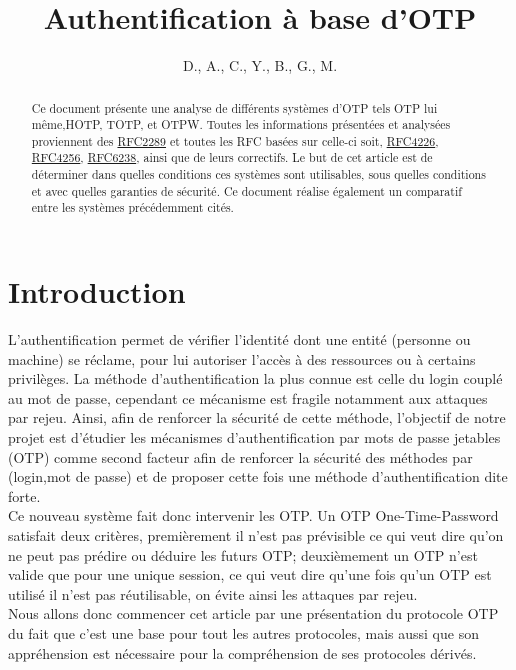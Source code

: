 \documentclass{../res/univ-projet}
\title{Authentification à base d'OTP}
\author{D.\bsc{Picard}, A.\bsc{Smondack}, C.\bsc{Hardouin}, Y.\bsc{Adegoloye}, B.\bsc{Zigh}, G.\bsc{Ferry}, M.\bsc{Michotte} }
\begin{document}
\maketitle

\begin{abstract}
Ce document présente une analyse de différents systèmes d'OTP tels \og{}OTP\fg{} lui même,\og{}HOTP\fg{}, \og{}TOTP\fg{},
et \og{}OTPW\fg{}. Toutes les informations présentées et analysées proviennent des \href{http://tools.ietf.org/html/rfc2289}{RFC2289} et 
toutes les RFC basées sur celle-ci soit, \href{http://tools.ietf.org/html/rfc4226}{RFC4226}, \href{http://tools.ietf.org/html/rfc4256}{RFC4256}, 
\href{http://tools.ietf.org/html/rfc6238}{RFC6238}, ainsi que de leurs correctifs. Le but de cet article est de déterminer dans quelles conditions 
ces systèmes sont utilisables, sous quelles conditions et avec quelles garanties de sécurité. Ce document réalise également un comparatif entre les 
systèmes précédemment cités.
\end{abstract}

\newpage
\tableofcontents
\newpage
\part{Introduction}
L'authentification permet de vérifier l'identité dont une entité (personne ou machine) se réclame, pour lui autoriser l'accès à des
ressources ou à certains privilèges. La méthode d'authentification la plus connue est celle du login couplé au mot de passe, cependant
ce mécanisme est fragile notamment aux attaques par rejeu. Ainsi, afin de renforcer la sécurité de cette méthode, 
l'objectif de notre projet est d'étudier les mécanismes d'authentification par mots de passe jetables (OTP) comme second facteur afin de renforcer la sécurité
des méthodes par (login,mot de passe) et de proposer cette fois une méthode d'authentification dite forte.\\
Ce nouveau système fait donc intervenir les OTP. Un OTP One-Time-Password satisfait deux critères, premièrement il n'est pas prévisible ce qui veut dire qu'on ne peut pas prédire 
ou déduire les futurs OTP; deuxièmement un OTP n'est valide que pour une unique session, ce qui veut dire qu'une fois qu'un OTP est utilisé il n'est pas réutilisable, on évite ainsi les
attaques par rejeu.\\
Nous allons donc commencer cet article par une présentation du protocole OTP du fait que c'est une base pour tout les autres protocoles, mais aussi que son appréhension est nécessaire pour la compréhension
de ses protocoles dérivés.
\setcounter{section}{0}
\end{document}
